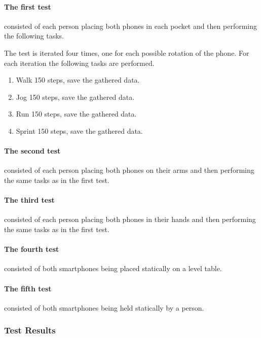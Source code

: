 \paragraph{The first test} consisted of each person placing both phones in each pocket and then performing the following tasks.

The test is iterated four times, one for each possible rotation of the phone.
For each iteration the following tasks are performed.

\begin{enumerate}
\item Walk 150 steps, save the gathered data.
\item Jog 150 steps, save the gathered data.
\item Run 150 steps, save the gathered data.
\item Sprint 150 steps, save the gathered data.
\end{enumerate}

\paragraph{The second test} consisted of each person placing both phones on their arms and then performing the same tasks as in the first test.

\paragraph{The third test} consisted of each person placing both phones in their hands and then performing the same tasks as in the first test.

\paragraph{The fourth test} consisted of both smartphones being placed statically on a level table.

\paragraph{The fifth test} consisted of both smartphones being held statically by a person.


\subsubsection{Test Results}



